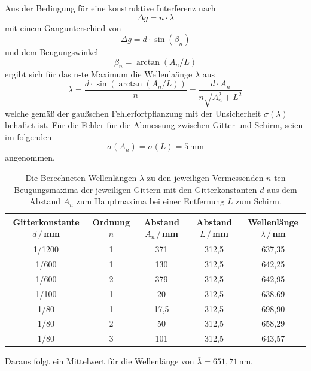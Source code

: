 Aus der Bedingung für eine konstruktive Interferenz nach
\begin{equation}
    \Delta g = n \cdot \lambda
\end{equation}
mit einem Gangunterschied von
\begin{equation}
    \Delta g = d \cdot \sin(\beta_n)
\end{equation}
und dem Beugungswinkel
\begin{equation}
    \beta_n=\arctan(A_n/L)
\end{equation}
ergibt sich für das n-te Maximum die Wellenlaänge $\lambda$ aus
\begin{equation}
    \lambda=\frac{d\cdot \sin(\arctan(A_n/L))}{n}=\frac{d\cdot A_n}{n\sqrt{A_n^2+L^2}}
\end{equation}
welche gemäß der gaußschen Fehlerfortpflanzung mit der Unsicherheit $\sigma(\lambda)$ behaftet ist.
Für die Fehler für die Abmessung zwischen Gitter und Schirm, seien im folgenden
\begin{equation*}
    \sigma(A_n)=\sigma(L)=5\,\text{mm}
\end{equation*}
angenommen.

\begin{table}
    \centering
    \caption{Die Berechneten Wellenlängen $\lambda$ zu den jeweiligen Vermessenden $n$-ten Beugungsmaxima der jeweiligen Gittern mit 
    den Gitterkonstanten $d$ aus dem Abstand $A_n$ zum Hauptmaxima bei einer Entfernung $L$ zum Schirm.}
    \begin{tabular}{c c c c c}
        \toprule
        Gitterkonstante $d\,/\,$mm & Ordnung $n$ & Abstand $A_n\,/\,$mm & Abstand $L\,/\,$mm & Wellenlänge $\lambda\,/\,$nm\\
        \midrule
        1/1200  &   1   &   371   &   312,5   &   637,35\\
        1/600   &   1   &   130   &   312,5   &   642,25\\
        1/600   &   2   &   379   &   312,5   &   642,95\\
        1/100   &   1   &   20      &   312,5   &   638.69\\
        1/80    &   1   &   17,5    &   312,5   &   698,90\\
        1/80    &   2   &   50      &   312,5   &   658,29\\
        1/80    &   3   &   101     &   312,5   &   643,57\\   
        \bottomrule
    \end{tabular}
    \label{tab:wellen}
\end{table}
Daraus folgt ein Mittelwert für die Wellenlänge von $\bar{\lambda}=651,71\,\text{nm}$.
